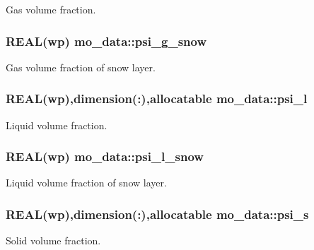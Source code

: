 Gas volume fraction. 

\hypertarget{namespacemo__data_a2ca2bd9402672a8327e4a68b3a14fd7f}{
\subsubsection[{psi\_\-g\_\-snow}]{\setlength{\rightskip}{0pt plus 5cm}REAL(wp) {\bf mo\_\-data::psi\_\-g\_\-snow}}}
\label{namespacemo__data_a2ca2bd9402672a8327e4a68b3a14fd7f}


Gas volume fraction of snow layer. 

\hypertarget{namespacemo__data_aac8ca74ef10b90da7bf9143bdc21ec3a}{
\subsubsection[{psi\_\-l}]{\setlength{\rightskip}{0pt plus 5cm}REAL(wp),dimension(:),allocatable {\bf mo\_\-data::psi\_\-l}}}
\label{namespacemo__data_aac8ca74ef10b90da7bf9143bdc21ec3a}


Liquid volume fraction. 

\hypertarget{namespacemo__data_a914d1e046ed2bfa66d84f8aecb2ed26f}{
\subsubsection[{psi\_\-l\_\-snow}]{\setlength{\rightskip}{0pt plus 5cm}REAL(wp) {\bf mo\_\-data::psi\_\-l\_\-snow}}}
\label{namespacemo__data_a914d1e046ed2bfa66d84f8aecb2ed26f}


Liquid volume fraction of snow layer. 

\hypertarget{namespacemo__data_a655b6d5f770ca3b4a1d2e22b627844e9}{
\subsubsection[{psi\_\-s}]{\setlength{\rightskip}{0pt plus 5cm}REAL(wp),dimension(:),allocatable {\bf mo\_\-data::psi\_\-s}}}
\label{namespacemo__data_a655b6d5f770ca3b4a1d2e22b627844e9}


Solid volume fraction. 

